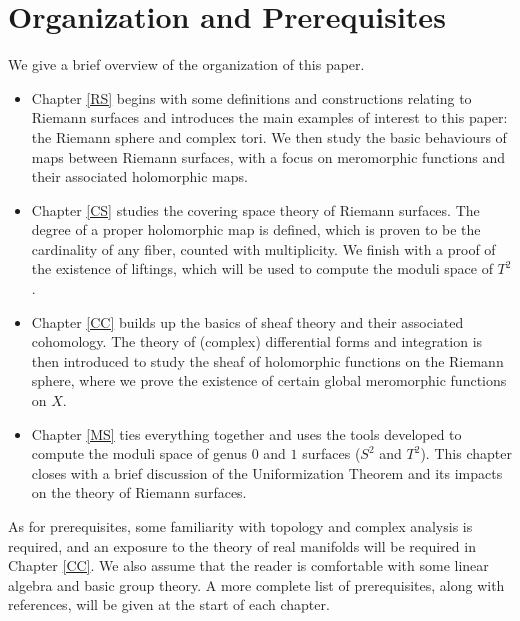 \documentclass[../Moduli_Spaces_of_Riemann_Surfaces.tex]{subfiles}
\begin{document}
    \section{Organization and Prerequisites}
    We give a brief overview of the organization of this paper.
    \begin{itemize}
        \item Chapter \ref{RS} begins with some definitions and constructions relating to Riemann surfaces and introduces the main examples of interest to this paper: the Riemann sphere and complex tori. We then study the basic behaviours of maps between Riemann surfaces, with a focus on meromorphic functions and their associated holomorphic maps.
            \vspace{-0.05in}
        \item Chapter \ref{CS} studies the covering space theory of Riemann surfaces. The degree of a proper holomorphic map is defined, which is proven to be the cardinality of any fiber, counted with multiplicity. We finish with a proof of the existence of liftings, which will be used to compute the moduli space of $T^2$.
            \vspace{-0.05in}
        \item Chapter \ref{CC} builds up the basics of sheaf theory and their associated cohomology. The theory of (complex) differential forms and integration is then introduced to study the sheaf of holomorphic functions on the Riemann sphere, where we prove the existence of certain global meromorphic functions on $X$.
            \vspace{-0.05in}
        \item Chapter \ref{MS} ties everything together and uses the tools developed to compute the moduli space of genus $0$ and $1$ surfaces ($S^2$ and $T^2$). This chapter closes with a brief discussion of the Uniformization Theorem and its impacts on the theory of Riemann surfaces.
    \end{itemize}
    As for prerequisites, some familiarity with topology and complex analysis is required, and an exposure to the theory of real manifolds will be required in Chapter \ref{CC}. We also assume that the reader is comfortable with some linear algebra and basic group theory. A more complete list of prerequisites, along with references, will be given at the start of each chapter.
\end{document}

